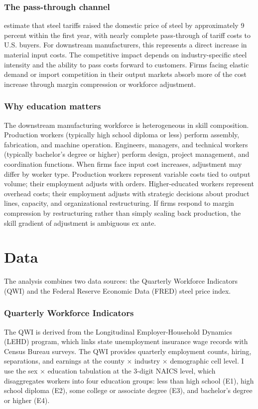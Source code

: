 \documentclass[12pt]{article}
\begin{document}
\subsubsection*{The pass-through channel} \citet{amiti2019} estimate that steel tariffs raised the domestic price of steel by approximately 9 percent within the first year, with nearly complete pass-through of tariff costs to U.S. buyers. For downstream manufacturers, this represents a direct increase in material input costs. The competitive impact depends on industry-specific steel intensity and the ability to pass costs forward to customers. Firms facing elastic demand or import competition in their output markets absorb more of the cost increase through margin compression or workforce adjustment.

\subsubsection*{Why education matters} The downstream manufacturing workforce is heterogeneous in skill composition. Production workers (typically high school diploma or less) perform assembly, fabrication, and machine operation. Engineers, managers, and technical workers (typically bachelor's degree or higher) perform design, project management, and coordination functions. When firms face input cost increases, adjustment may differ by worker type. Production workers represent variable costs tied to output volume; their employment adjusts with orders. Higher-educated workers represent overhead costs; their employment adjusts with strategic decisions about product lines, capacity, and organizational restructuring. If firms respond to margin compression by restructuring rather than simply scaling back production, the skill gradient of adjustment is ambiguous ex ante.

\section{Data}

The analysis combines two data sources: the Quarterly Workforce Indicators (QWI) and the Federal Reserve Economic Data (FRED) steel price index.

\subsubsection*{Quarterly Workforce Indicators} The QWI is derived from the Longitudinal Employer-Household Dynamics (LEHD) program, which links state unemployment insurance wage records with Census Bureau surveys. The QWI provides quarterly employment counts, hiring, separations, and earnings at the county $\times$ industry $\times$ demographic cell level. I use the sex $\times$ education tabulation at the 3-digit NAICS level, which disaggregates workers into four education groups: less than high school (E1), high school diploma (E2), some college or associate degree (E3), and bachelor's degree or higher (E4).
\end{document}
